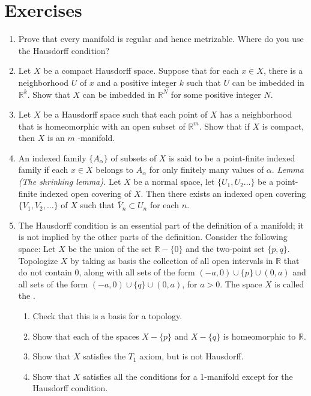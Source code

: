 \section*{Exercises}
\begin{enumerate}[itemsep=0.4em, parsep=0pt, topsep=0pt, partopsep=0pt, leftmargin=*, label=\arabic*., ref=\arabic*]
\item Prove that every manifold is regular and hence metrizable. Where do you use the Hausdorff condition?
\item Let \(X\) be a compact Hausdorff space. Suppose that for each \(x \in X\), there is a neighborhood \(U\) of \(x\) and a positive integer \(k\) such that \(U\) can be imbedded in \(\mathbb{R}^{k}\). Show that \(X\) can be imbedded in \(\mathbb{R}^{N}\) for some positive integer \(N\).
\item Let \(X\) be a Hausdorff space such that each point of \(X\) has a neighborhood that is homeomorphic with an open subset of \(\mathbb{R}^{m}\). Show that if \(X\) is compact, then \(X\) is an \(m\) -manifold.
\item An indexed family \(\{ A_{\alpha }\}\) of subsets of \(X\) is said to be a point-finite indexed family if each \(x \in X\) belongs to \(A_{\alpha }\) for only finitely many values of \(\alpha\). \textsl{Lemma (The shrinking lemma).} Let \(X\) be a normal space, let \(\{ {U_{1},U_{2}\ldots }\}\) be a point-finite indexed open covering of \(X\). Then there exists an indexed open covering \(\{ {V_{1},V_{2},\ldots }\}\) of \(X\) such that \(\bar{V}_{n} \subset {U}_{n}\) for each \(n\). 
\item The Hausdorff condition is an essential part of the definition of a manifold; it is not implied by the other parts of the definition. Consider the following space: Let \(X\) be the union of the set \(\mathbb{R} - \{ 0\}\) and the two-point set \(\{ p,q\}\). Topologize \(X\) by taking as basis the collection of all open intervals in \(\mathbb{R}\) that do not contain 0, along with all sets of the form \(( {-a,0}) \cup \{ p\} \cup ( {0,a})\) and all sets of the form \(( {-a,0}) \cup \{ q\} \cup ( {0,a})\), for \(a > 0\). The space \(X\) is called the .
 \begin{enumerate}[itemsep=0.2em, parsep=0pt, topsep=0pt, partopsep=0pt, leftmargin=*, label=(\alph*), align=left]
 \item Check that this is a basis for a topology.
 \item Show that each of the spaces \(X - \{ p\}\) and \(X - \{ q\}\) is homeomorphic to \(\mathbb{R}\).
 \item Show that \(X\) satisfies the \(T_{1}\) axiom, but is not Hausdorff.
 \item Show that \(X\) satisfies all the conditions for a 1-manifold except for the Hausdorff condition.
 \end{enumerate}
\end{enumerate}

